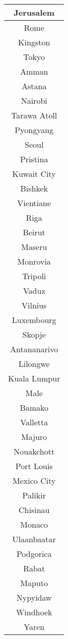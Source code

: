 \documentclass{article}
\begin{document}
\begin{center}
\begin{tabular} {|| c ||}
   Jerusalem\\ \hline 
   Rome\\ \hline 
   Kingston\\ \hline 
   Tokyo\\ \hline 
   Amman\\ \hline 
   Astana\\ \hline 
   Nairobi\\ \hline 
   Tarawa Atoll\\ \hline 
   Pyongyang\\ \hline 
   Seoul\\ \hline 
   Pristina\\ \hline 
   Kuwait City\\ \hline 
   Bishkek\\ \hline 
   Vientiane\\ \hline 
   Riga\\ \hline 
   Beirut\\ \hline 
   Maseru\\ \hline 
   Monrovia\\ \hline 
   Tripoli\\ \hline 
   Vaduz\\ \hline 
   Vilnius\\ \hline 
   Luxembourg\\ \hline 
   Skopje\\ \hline 
   Antananarivo\\ \hline 
   Lilongwe\\ \hline 
   Kuala Lumpur\\ \hline 
   Male\\ \hline 
   Bamako\\ \hline 
   Valletta\\ \hline 
   Majuro\\ \hline 
   Nouakchott\\ \hline 
   Port Louis\\ \hline 
   Mexico City\\ \hline 
   Palikir\\ \hline 
   Chisinau\\ \hline 
   Monaco\\ \hline 
   Ulaanbaatar\\ \hline 
   Podgorica\\ \hline 
   Rabat\\ \hline 
   Maputo\\ \hline 
   Nypyidaw\\ \hline 
   Windhoek\\ \hline 
   Yaren\\ \hline 

\end{tabular}
\end{center}
\end{document}
